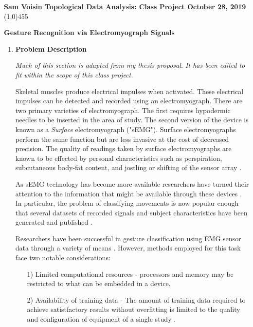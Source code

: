 \documentclass[11pt]{article}
\begin{document}
\noindent \textbf{Sam Voisin \hfill  \textbf{Topological Data Analysis: Class Project}  \hfill  October 28, 2019} \\
\line(1,0){455}

\begin{center}
\Large{{\bf Gesture Recognition via Electromyograph Signals}}\\
\end{center}

\begin{enumerate}
\setlength{\parindent}{5ex}

\item \textbf{Problem Description}

\noindent
\emph{Much of this section is adapted from my thesis proposal. It has been edited to fit within the scope of this class project.}

Skeletal muscles produce electrical impulses when activated. These electrical impulses can be detected and recorded using an electromyograph. There are two primary varieties of electromyograph. The first requires hypodermic needles to be inserted in the area of study. The second version of the device is known as a \emph{Surface} electromyograph ("sEMG"). Surface electromyographs perform the same function but are less invasive at the cost of decreased precision. The quality of readings taken by surface electromyographs are known to be effected by personal characteristics such as perspiration, subcutaneous body-fat content, and jostling or shifting of the sensor array \cite{lobov}.

As sEMG technology has become more available researchers have turned their attention to the information that might be available through these devices \cite{state}. In particular, the problem of classifying movements is now popular enough that several datasets of recorded signals and subject characteristics have been generated and published \cite{ninapro}.

Researchers have been successful in gesture classification using EMG sensor data through a variety of means \cite{state}. However, methods employed for this task face two notable considerations:
\begin{enumerate}
\item[1)] Limited computational resources - processors and memory may be restricted to what can be embedded in a device.
\item[2)] Availability of training data - The amount of training data required to achieve satistfactory results without overfitting is limited to  the quality and configuration of equipment of a single study \cite{bigdata}.
\end{enumerate}


\end{enumerate}
\end{document}
